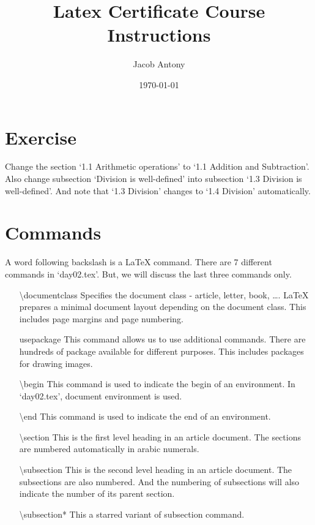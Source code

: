 \documentclass{article}
\title{Latex Certificate Course Instructions}
\author{Jacob Antony}
\date{\today}
\begin{document}
\maketitle

\section{Exercise}
Change the section `1.1 Arithmetic operations' to `1.1 Addition and Subtraction'. Also change subsection `Division is well-defined' into subsection `1.3 Division is well-defined'. And note that `1.3 Division' changes to `1.4 Division' automatically.

\section{Commands}
	A word following backslash is a \LaTeX{} command. There are 7 different commands in `day02.tex'. But, we will discuss the last three commands only.
	\begin{enumerate}
		\item[\textbackslash documentclass] Specifies the document class - article, letter, book, \dots. \LaTeX{} prepares a minimal document layout depending on the document class. This includes page margins and page numbering.
		\item[usepackage] This command allows us to use additional commands. There are hundreds of package available for different purposes. This includes packages for drawing images.
		\item[\textbackslash begin] This command is used to indicate the begin of an environment. In `day02.tex', document environment is used.
		\item[\textbackslash end] This command is used to indicate the end of an environment. 
		\item[\textbackslash section] This is the first level heading in an article document. The sections are numbered automatically in arabic numerals.
		\item[\textbackslash subsection] This is the second level heading in an article document. The subsections are also numbered. And the numbering of subsections will also indicate the number of its parent section.
		\item[\textbackslash subsection*] This a starred variant of subsection command.
	\end{enumerate}
\end{document}
